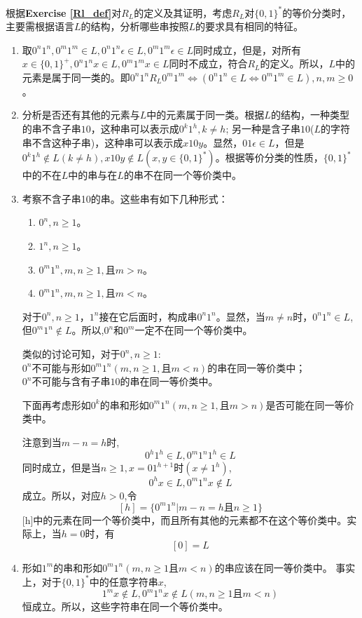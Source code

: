 \begin{solution}
	根据\textbf{Exercise \ref{Rl_def}}对$R_L$的定义及其证明，考虑$R_L$对$\{0,1\}^\ast$的等价分类时，主要需根据语言$L$的结构，分析哪些串按照$L$的要求具有相同的特征。
	\begin{enumerate}
		\item 取$0^n1^n,0^m1^m\in L,0^n1^n\epsilon\in L,0^m1^m\epsilon\in L$同时成立，但是，对所有$x\in\{0,1\}^+,0^n1^nx\in L,0^m1^mx\in L$同时不成立，符合$R_L$的定义。所以，$L$中的元素是属于同一类的。即$0^n1^nR_L0^m1^m\Leftrightarrow(0^n1^n\in L\Leftrightarrow 0^m1^m\in L),n,m\ge 0$。		
		
		\item 分析是否还有其他的元素与$L$中的元素属于同一类。根据$L$的结构，一种类型的串不含子串$10$，这种串可以表示成$0^k1^h,k\ne h$; 另一种是含子串$10$($L$的字符串不含这种子串)，这种串可以表示成$x10y$。显然，$01\epsilon\in L$，但是$0^k1^h\notin L(k\ne h),x10y\notin L(x,y\in\{0,1\}^\ast)$。根据等价分类的性质，$\{0,1\}^\ast$中的不在$L$中的串与在$L$的串不在同一个等价类中。
		
		\item 考察不含子串10的串。这些串有如下几种形式：
		\begin{enumerate}
			\item $0^n,n\ge 1$。
			\item $1^n,n\ge 1$。
			\item $0^m1^n,m,n\ge 1,\text{且}m>n$。
			\item $0^m1^n,m,n\ge 1,\text{且}m<n$。
		\end{enumerate}
		对于$0^n,n\ge 1$，$1^n$接在它后面时，构成串$0^n1^n$。显然，当$m\ne n$时，$0^n1^n\in L$, 但$0^m1^n\notin L$。所以,$0^n$和$0^m$一定不在同一个等价类中。
		
		类似的讨论可知，对于$0^n,n\ge 1$:\\	
		$0^n$不可能与形如$0^m1^n(m,n\ge 1,\text{且}m<n)$的串在同一等价类中；\\
		$0^n$不可能与含有子串$10$的串在同一等价类中。
		
		下面再考虑形如$0^k$的串和形如$0^m1^n(m,n\ge 1,\text{且}m>n)$是否可能在同一等价类中。
		
		注意到当$m-n=h$时,
		$$0^h1^h\in L,0^m1^n1^h\in L$$
		同时成立，但是当$n\ge 1,x=01^{h+1}$时$(x\ne 1^h)$,
		$$0^hx\in L,0^m1^nx\notin L$$
		成立。所以，对应$h>0$,令
		$$[h]=\{0^m1^n|m-n=h\text{且}n\ge 1\}$$
		[h]中的元素在同一个等价类中，而且所有其他的元素都不在这个等价类中。实际上，当$h=0$时，有
		$$[0] = L$$
		
		\item 形如$1^m$的串和形如$0^m1^n(m,n\ge 1\text{且}m<n)$的串应该在同一等价类中。	事实上，对于$\{0,1\}^\ast$中的任意字符串$x$,
		$$1^mx\notin L,0^m1^nx\notin L(m,n\ge 1\text{且}m<n)$$
		恒成立。所以，这些字符串在同一个等价类中。
		

\end{enumerate}
\end{solution}
